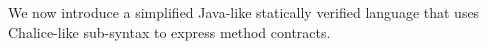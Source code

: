 
We now introduce a simplified Java-like statically verified language \svlidf that uses Chalice-like sub-syntax to express method contracts.


